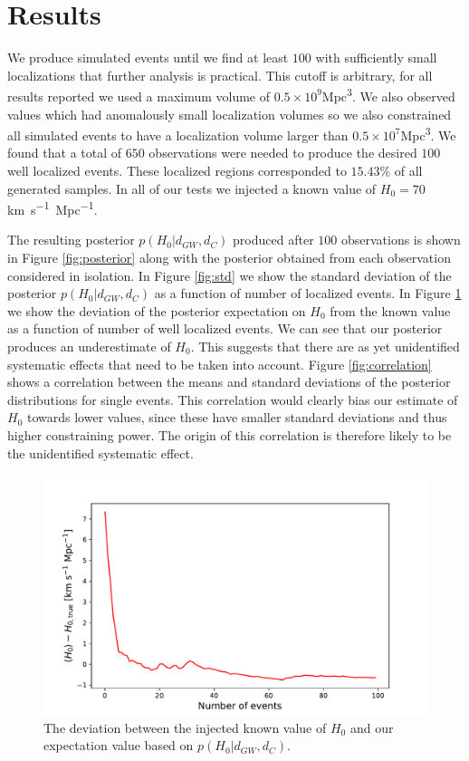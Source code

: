 \section{Results} \label{sec:conclusions}
We produce simulated events until we find at least $100$ with sufficiently small localizations that further analysis is practical.
This cutoff is arbitrary, for all results reported we used a maximum volume of $0.5\times 10^{9}$\si{Mpc^3}.
We also observed values which had anomalously small localization volumes so we also constrained all simulated events to have a localization volume larger than $0.5\times 10^{7}$\si{Mpc^3}.
We found that a total of $650$ observations were needed to produce the desired $100$ well localized events.
These localized regions corresponded to $15.43\%$ of all generated samples.
In all of our tests we injected a known value of $H_0=70$\si{km.s^{-1}.Mpc^{-1}}.

The resulting posterior $p(H_0 | d_{GW}, d_C)$ produced after $100$ observations is shown in Figure \ref{fig:posterior} along with the posterior obtained from each observation considered in isolation.
In Figure \ref{fig:std} we show the standard deviation of the posterior $p(H_0 | d_{GW}, d_C)$ as a function of number of localized events.
In Figure \ref{fig:mean_diff} we show the deviation of the posterior expectation on $H_0$ from the known value as a function of number of well localized events.
We can see that our posterior produces an underestimate of $H_0$.
This suggests that there are as yet unidentified systematic effects that need to be taken into account.
Figure \ref{fig:correlation} shows a correlation between the means and standard deviations of the posterior distributions for single events.
This correlation would clearly bias our estimate of $H_0$ towards lower values, since these have smaller standard deviations and thus higher constraining power.
The origin of this correlation is therefore likely to be the unidentified systematic effect.

\begin{figure}
    \centering
    \includegraphics[width=0.95\columnwidth]{figures/diff.pdf}
    \caption{The deviation between the injected known value of $H_0$ and our expectation value based on $p(H_0 | d_{GW}, d_C)$.}
    \label{fig:mean_diff}
\end{figure}

